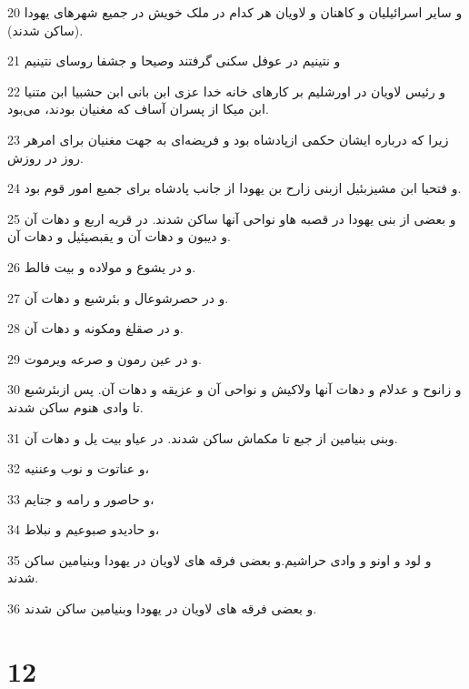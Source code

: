 \par 20 و سایر اسرائیلیان و کاهنان و لاویان هر کدام در ملک خویش در جمیع شهرهای یهودا (ساکن شدند).
\par 21 و نتینیم در عوفل سکنی گرفتند وصیحا و جشفا روسای نتینیم
\par 22 و رئیس لاویان در اورشلیم بر کارهای خانه خدا عزی ابن بانی ابن حشبیا ابن متنیا ابن میکا از پسران آساف که مغنیان بودند، می‌بود.
\par 23 زیرا که درباره ایشان حکمی ازپادشاه بود و فریضه‌ای به جهت مغنیان برای امرهر روز در روزش.
\par 24 و فتحیا ابن مشیزبئیل ازبنی زارح بن یهودا از جانب پادشاه برای جمیع امور قوم بود.
\par 25 و بعضی از بنی یهودا در قصبه هاو نواحی آنها ساکن شدند. در قریه اربع و دهات آن و دیبون و دهات آن و یقبصیئیل و دهات آن.
\par 26 و در یشوع و مولاده و بیت فالط.
\par 27 و در حصرشوعال و بئرشبع و دهات آن.
\par 28 و در صقلغ ومکونه و دهات آن.
\par 29 و در عین رمون و صرعه ویرموت.
\par 30 و زانوح و عدلام و دهات آنها ولاکیش و نواحی آن و عزیقه و دهات آن. پس ازبئرشبع تا وادی هنوم ساکن شدند.
\par 31 وبنی بنیامین از جبع تا مکماش ساکن شدند. در عیاو بیت یل و دهات آن.
\par 32 و عناتوت و نوب وعننیه،
\par 33 و حاصور و رامه و جتایم،
\par 34 و حادیدو صبوعیم و نبلاط،
\par 35 و لود و اونو و وادی حراشیم.و بعضی فرقه های لاویان در یهودا وبنیامین ساکن شدند.
\par 36 و بعضی فرقه های لاویان در یهودا وبنیامین ساکن شدند.
 
\chapter{12}

